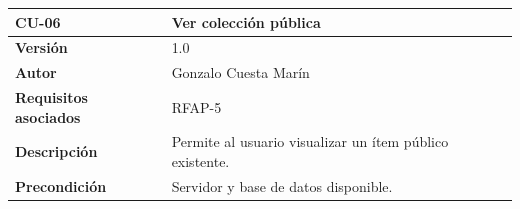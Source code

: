 \documentclass[
]{article}
\begin{document}
\begin{longtable}[]{@{}ll@{}}
\toprule
\begin{minipage}[b]{0.25\columnwidth}\raggedright
\textbf{CU-06}\strut
\end{minipage} & \begin{minipage}[b]{0.69\columnwidth}\raggedright
\textbf{Ver colección pública}\strut
\end{minipage}\tabularnewline
\midrule
\endhead
\begin{minipage}[t]{0.25\columnwidth}\raggedright
\textbf{Versión}\strut
\end{minipage} & \begin{minipage}[t]{0.69\columnwidth}\raggedright
1.0\strut
\end{minipage}\tabularnewline
\begin{minipage}[t]{0.25\columnwidth}\raggedright
\textbf{Autor}\strut
\end{minipage} & \begin{minipage}[t]{0.69\columnwidth}\raggedright
Gonzalo Cuesta Marín\strut
\end{minipage}\tabularnewline
\begin{minipage}[t]{0.25\columnwidth}\raggedright
\textbf{Requisitos asociados}\strut
\end{minipage} & \begin{minipage}[t]{0.69\columnwidth}\raggedright
RFAP-5\strut
\end{minipage}\tabularnewline
\begin{minipage}[t]{0.25\columnwidth}\raggedright
\textbf{Descripción}\strut
\end{minipage} & \begin{minipage}[t]{0.69\columnwidth}\raggedright
Permite al usuario visualizar un ítem público existente.\strut
\end{minipage}\tabularnewline
\begin{minipage}[t]{0.25\columnwidth}\raggedright
\textbf{Precondición}\strut
\end{minipage} & \begin{minipage}[t]{0.69\columnwidth}\raggedright
Servidor y base de datos disponible.


\end{minipage}
\end{longtable}
\end{document}
